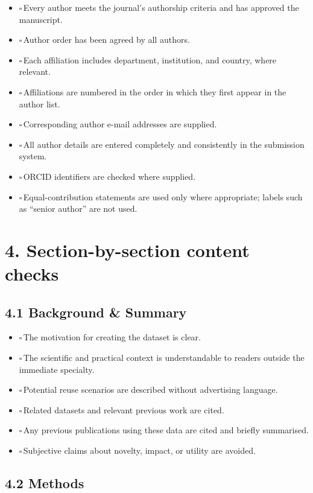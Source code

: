 \documentclass[11pt]{article}
\newcommand{\cbox}{$\square$\,}
\begin{document}
\begin{itemize}
    \item \cbox Every author meets the journal's authorship criteria and has approved the manuscript.
    \item \cbox Author order has been agreed by all authors.
    \item \cbox Each affiliation includes department, institution, and country, where relevant.
    \item \cbox Affiliations are numbered in the order in which they first appear in the author list.
    \item \cbox Corresponding author e-mail addresses are supplied.
    \item \cbox All author details are entered completely and consistently in the submission system.
    \item \cbox ORCID identifiers are checked where supplied.
    \item \cbox Equal-contribution statements are used only where appropriate; labels such as ``senior author'' are not used.
\end{itemize}

\section*{4. Section-by-section content checks}

\subsection*{4.1 Background \& Summary}

\begin{itemize}
    \item \cbox The motivation for creating the dataset is clear.
    \item \cbox The scientific and practical context is understandable to readers outside the immediate specialty.
    \item \cbox Potential reuse scenarios are described without advertising language.
    \item \cbox Related datasets and relevant previous work are cited.
    \item \cbox Any previous publications using these data are cited and briefly summarised.
    \item \cbox Subjective claims about novelty, impact, or utility are avoided.
\end{itemize}

\subsection*{4.2 Methods}
\end{document}
